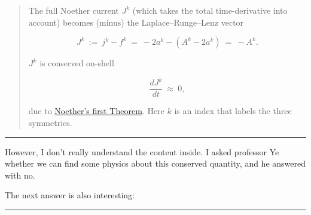 \begin{quote}
        The full Noether current $J^k$ (which takes the total time-derivative into account) becomes (minus) the Laplace–Runge–Lenz vector

        $$ J^k~:=~j^k-f^k~=~ -2a^k-(A^k-2a^k)~=~ -A^k.$$

        $J^k$ is conserved on-shell 

        $$\frac{dJ^k}{dt} ~\approx~  0,$$  

        due to \href{http://en.wikipedia.org/wiki/Noether%27s_theorem}{Noether's first Theorem}. Here $k$ is an index that labels the three symmetries.
    \end{quote}

    \begin{center}\noindent\rule{8cm}{0.4pt}\end{center}

    However, I don't really understand the content inside. I asked professor
    Ye whether we can find some physics about this conserved quantity, and
    he answered with no.

    The next answer is also interesting:
    
    \begin{center}\noindent\rule{8cm}{0.4pt}\end{center}

